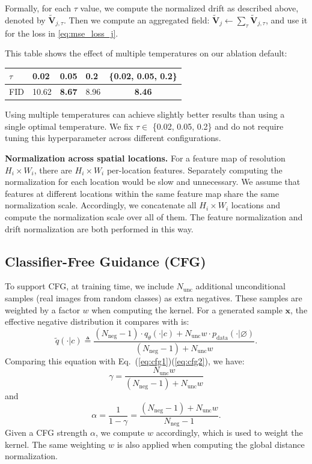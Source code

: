 \documentclass{article}
\newcommand{\tablestyle}[2]{\setlength{\tabcolsep}{#1}\renewcommand{\arraystretch}{#2}\centering
\small
}
\newcommand\tablefontsize{%
  \fontsize{8pt}{9pt}\selectfont
}
\newcommand{\vv}[1]{\mathbf{#1}}
\newcommand{\x}{\vv{x}}
\newcommand{\V}{\vv{V}}
\renewcommand{\paragraph}[1]{\vspace{.05em}\noindent\textbf{#1}}
\theoremstyle{plain}
\theoremstyle{definition}
\theoremstyle{remark}
\begin{document}
Formally, for each $\tau$ value, we compute the normalized drift as described above, denoted by $\tilde{\V}_{j,\tau}$. Then we compute an aggregated field: $\tilde{\V}_j \leftarrow \sum_\tau \tilde{\V}_{j,\tau}$, and use it for the loss in \cref{eq:mse_loss_j}.


This table shows the effect of multiple temperatures on our ablation default:
\begin{center}
    \tablestyle{4pt}{1.05}
    \tablefontsize
    \begin{tabular}{l | x{32} x{32} x{32} | c}
    \toprule
    $\tau$ & 0.02 & 0.05 & 0.2 & \{0.02, 0.05, 0.2\} \\
    \midrule
    FID & 10.62 & \textbf{8.67} & 8.96 & \textbf{8.46} \\
    \bottomrule
    \end{tabular}
\end{center}
Using multiple temperatures can achieve slightly better results than using a single optimal temperature. We fix $\tau \in $ \{0.02, 0.05, 0.2\} and do not require tuning this hyperparameter across different configurations.


\paragraph{Normalization across spatial locations.}
For a feature map of resolution $H_i{\times}W_i$, there are $H_i{\times}W_i$ per-location features.
Separately computing the normalization for each location would be slow and unnecessary.
We assume that features at different locations within the same feature map share the same normalization scale. Accordingly, we concatenate all $H_i{\times}W_i$ locations and compute the normalization scale over all of them.
The feature normalization and drift normalization are both performed in this way.


\subsection{Classifier-Free Guidance (CFG)}
\label{sec:appendix_cfg}

To support CFG, at training time, we include $N_\text{unc}$ additional \mbox{unconditional} samples (real images from random classes) as extra negatives.
These samples are weighted by a factor $w$ when computing the kernel.
For a generated sample $\x$, the effective negative distribution it compares with is:
\[
\tilde{q}(\cdot|c) \triangleq \frac{(N_\text{neg}{-}1) \cdot q_\theta(\cdot|c) + N_\text{unc}  w \cdot p_{\text{data}}(\cdot|\varnothing)}{(N_\text{neg}{-}1) + N_\text{unc} w}.
\]
Comparing this equation with Eq.~(\ref{eq:cfg1})(\ref{eq:cfg2}), we have:
\[
\gamma = \frac{N_\text{unc} w}{(N_\text{neg}{-}1) + N_\text{unc} w}
\]
and
\[
\alpha = \frac{1}{1-\gamma} = \frac{(N_\text{neg}{-}1) + N_\text{unc} w}{N_\text{neg}{-}1}.
\]
Given a CFG strength $\alpha$, we compute $w$ accordingly, which is used to weight the kernel.
The same weighting $w$ is also applied when computing the global distance normalization.
\end{document}
